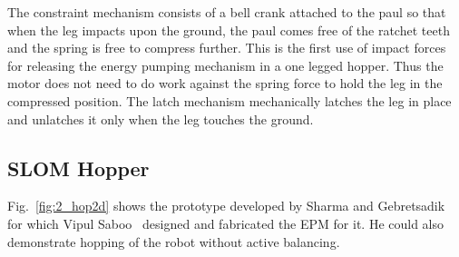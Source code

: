 The constraint mechanism consists of a bell crank attached to the paul so that when the leg impacts upon the ground, the paul comes 
free of the ratchet teeth and the spring is free to compress further. This is the first use of impact forces for releasing the energy 
pumping mechanism in a one legged hopper. Thus the motor does not need to do work against the spring force to hold the leg in the compressed position. The latch mechanism mechanically latches the leg in place and unlatches it only when the leg touches the ground.
\subsection{SLOM Hopper}
Fig.~\ref{fig:2_hop2d} shows the prototype developed by Sharma and Gebretsadik~\cite{londhe} for which Vipul Saboo~\cite{saboo} 
designed and fabricated the EPM for it. He could also demonstrate hopping of the robot without active balancing.

